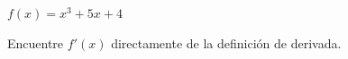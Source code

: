 \setcounter{enumi}{10}
\item $f(x) = x^3 + 5x + 4$
\par
Encuentre $f'(x)$ directamente de la definición de derivada.
